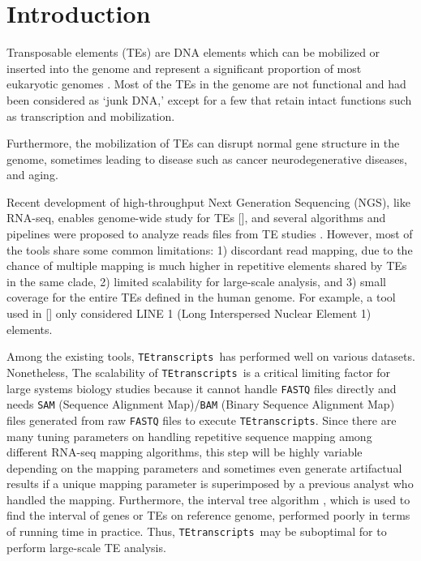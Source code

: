 \documentclass[wsdraft]{ws-procs11x85}
\newcommand{\TEtranscripts}{\texttt{TEtranscripts}}
\begin{document}
\bodymatter

\section{Introduction}\label{aba:intro}

Transposable elements (TEs) are DNA elements which can be mobilized or inserted into the genome and represent a significant proportion of most eukaryotic genomes \cite{erwin2014mobile}. 
Most of the TEs in the genome are not functional and had been considered as `junk DNA,' except for a few that retain intact functions such as transcription and mobilization.\cite{biemont2006genetics}

Furthermore, the mobilization of TEs can disrupt normal gene structure in the genome, sometimes leading to disease such as cancer \cite{belancio2008mammalian,jirtle2007environmental} neurodegenerative diseases,\cite{erwin2014mobile} and aging.\cite{wood2013chromatin} 

Recent development of high-throughput Next Generation Sequencing (NGS), like RNA-seq, enables genome-wide study for TEs [], and several algorithms and pipelines were proposed to analyze reads files from TE studies \cite{lee2012landscape,platzer2012te,helman2014somatic,henaff2015jitterbug,jin2015tetranscripts,de2017identifying,tang2017human}. However, most of the tools share some common limitations: 1) discordant read mapping, due to the chance of multiple mapping is much higher in repetitive elements shared by TEs in the same clade, 2) limited scalability for large-scale analysis, and 3) small coverage for the entire TEs defined in the human genome. 
For example, a tool used in [] only considered LINE 1 (Long Interspersed Nuclear Element 1) elements.\cite{ewing2015transposable} 

Among the existing tools, \TEtranscripts~has performed well on various datasets.\cite{jin2015tetranscripts}
Nonetheless, The scalability of \TEtranscripts~is a critical limiting factor for large systems biology studies because it cannot handle \verb|FASTQ| files directly and needs \verb|SAM| (Sequence Alignment Map)/\verb|BAM| (Binary Sequence Alignment Map) files generated from raw \verb|FASTQ| files to execute \TEtranscripts. Since there are many tuning parameters on handling repetitive sequence mapping among different RNA-seq mapping algorithms, this step will be highly variable depending on the mapping parameters and sometimes even generate artifactual results if a unique mapping parameter is superimposed by a previous analyst who handled the mapping. 
Furthermore, the interval tree algorithm \cite{samet1990design}, which is used to find the interval of genes or TEs on reference genome,  performed poorly in terms of running time in practice. Thus, \TEtranscripts~may be suboptimal for to perform large-scale TE analysis.
\end{document}
